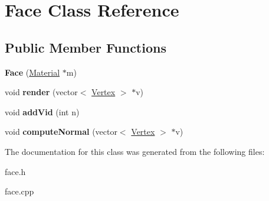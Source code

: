 \hypertarget{classFace}{\section{Face Class Reference}
\label{classFace}
}
\subsection*{Public Member Functions}
\begin{DoxyCompactItemize}
\item 
\hypertarget{classFace_aa88eaa601c581d6ce7607dde91ec9b0f}{{\bfseries Face} (\hyperlink{classMaterial}{Material} $\ast$m)}\label{classFace_aa88eaa601c581d6ce7607dde91ec9b0f}

\item 
\hypertarget{classFace_ab188943badc644df75d80bd23659d0ff}{void {\bfseries render} (vector$<$ \hyperlink{classVertex}{Vertex} $>$ $\ast$v)}\label{classFace_ab188943badc644df75d80bd23659d0ff}

\item 
\hypertarget{classFace_a0eaab6974ce7a4fb94eb83869f3eeccb}{void {\bfseries add\-Vid} (int n)}\label{classFace_a0eaab6974ce7a4fb94eb83869f3eeccb}

\item 
\hypertarget{classFace_a171665b51a6266b979763ab55519c539}{void {\bfseries compute\-Normal} (vector$<$ \hyperlink{classVertex}{Vertex} $>$ $\ast$v)}\label{classFace_a171665b51a6266b979763ab55519c539}

\end{DoxyCompactItemize}


The documentation for this class was generated from the following files\-:\begin{DoxyCompactItemize}
\item 
face.\-h\item 
face.\-cpp\end{DoxyCompactItemize}

